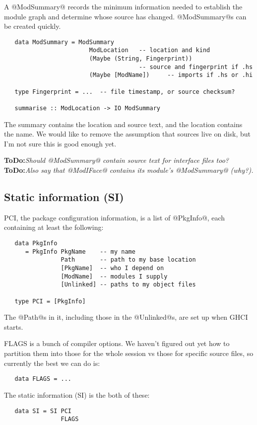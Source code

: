 \documentclass[11pt]{article}
\newcommand{\ToDo}[1]{{{\bf ToDo:}\sl #1}}
\begin{document}
A @ModSummary@ records the minimum information needed to establish the
module graph and determine whose source has changed.  @ModSummary@s
can be created quickly.
\begin{verbatim}
   data ModSummary = ModSummary 
                        ModLocation   -- location and kind
                        (Maybe (String, Fingerprint))
                                      -- source and fingerprint if .hs
                        (Maybe [ModName])     -- imports if .hs or .hi

   type Fingerprint = ...  -- file timestamp, or source checksum?

   summarise :: ModLocation -> IO ModSummary
\end{verbatim}

The summary contains the location and source text, and the location
contains the name.  We would like to remove the assumption that
sources live on disk, but I'm not sure this is good enough yet.

\ToDo{Should @ModSummary@ contain source text for interface files too?}
\ToDo{Also say that @ModIFace@ contains its module's @ModSummary@  (why?).}


\subsection{Static information (SI)}
\label{sec:staticinfo}

PCI, the package configuration information, is a list of @PkgInfo@,
each containing at least the following:
\begin{verbatim}
   data PkgInfo
      = PkgInfo PkgName    -- my name
                Path       -- path to my base location
                [PkgName]  -- who I depend on
                [ModName]  -- modules I supply
                [Unlinked] -- paths to my object files

   type PCI = [PkgInfo]
\end{verbatim}
The @Path@s in it, including those in the @Unlinked@s, are set up
when GHCI starts.  

FLAGS is a bunch of compiler options.  We haven't figured out yet how
to partition them into those for the whole session vs those for
specific source files, so currently the best we can do is:
\begin{verbatim}
   data FLAGS = ...
\end{verbatim}

The static information (SI) is the both of these:
\begin{verbatim}
   data SI = SI PCI
                FLAGS
\end{verbatim}
\end{document}
